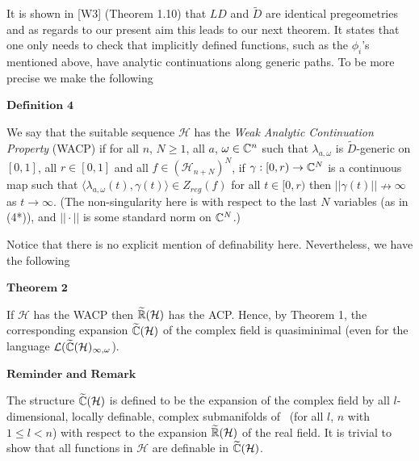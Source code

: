 \documentclass[12pt,nodate]{article}
\begin{document}
 It is shown in [W3] (Theorem 1.10) that $LD$ and $\widetilde{D}$ are identical pregeometries and as regards to our present aim this leads to our next theorem. It states that one only needs to check that implicitly defined functions, such as the $\phi_i$'s mentioned above, have 
 analytic continuations along generic paths. To be more precise we make the following
 
 \vspace{3mm}
 
 \noindent
 $\mathbf{Definition}$ $\mathbf{4}$
 
 \vspace{1mm}
 
 We say that the suitable sequence $\mathcal{H}$ has the \emph{Weak Analytic Continuation Property} (WACP) if for all $n$, $N \geq 1$, all $a$, $\omega \in \mathbb{C}^{n}$ such that $\lambda_{a, \omega}$ is $\widetilde{D}$-generic on $[0, 1]$, all $r \in [0, 1]$ and all $f \in (\mathcal{H}_{n+N})^N$, if $\gamma : [0, r) \rightarrow \mathbb{C}^N$ is a continuous map such that $\langle \lambda_{a, \omega} (t), \gamma (t) \rangle \in Z_{reg} (f)$ for all $t \in [0, r)$ then $|| \gamma (t) || \nrightarrow \infty$ as $t \rightarrow \infty$. (The non-singularity here is with respect to the last $N$ variables (as in (4*)), and $|| \cdot ||$ is some standard norm on $\mathbb{C}^N$.)
 
 \vspace{3mm}
 
 Notice that there is no explicit mention of definability here. Nevertheless, we have the following
 
 \vspace{3mm}
 
 \noindent 
 $\mathbf{Theorem}$ $\mathbf{2}$
 
 \vspace{1mm}
 
 If $\mathcal{H}$ has the WACP then $\widetilde{\mathbb{R}}(\mathcal{H})$ has the ACP. Hence, by Theorem 1, the corresponding expansion $\widetilde{\mathbb{C}}(\mathcal{H})$ of the complex field is 
 quasiminimal (even for the language $\mathcal{L}(\widetilde{\mathbb{C}}(\mathcal{H})_{\infty , \omega}$).
 
 \vspace{3mm}
 
 \noindent
$\mathbf{Reminder}$ $\mathbf{and}$ $\mathbf{Remark}$
 
\vspace{1mm}
 
 
The structure $\widetilde{\mathbb{C}}(\mathcal{H})$
 is defined to be the expansion of the complex field by all $l$-dimensional, locally definable, complex submanifolds of \C\  (for all $l$, $n$ with $1 \leq l < n$) with respect to the expansion $\widetilde{\mathbb{R}}(\mathcal{H})$ of the real field. It is trivial to show that all functions in $\mathcal{H}$ are definable in $\widetilde{\mathbb{C}}(\mathcal{H})$.
\end{document}
